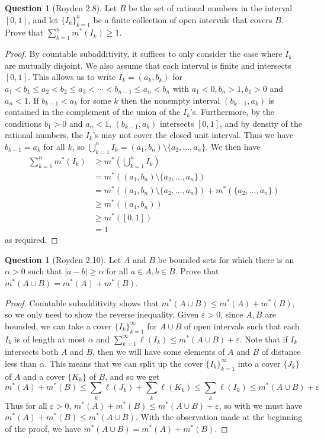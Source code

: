 \documentclass{article}
\theoremstyle{definition} %
\numberwithin{thm}{section} %
\theoremstyle{definition} %
\newtheorem{question}[thm]{Question}
\begin{document}
\begin{question}[Royden 2.8]
Let $B$ be the set of rational numbers in the interval $[0, 1]$, and let ${\{I_k\}}_{k = 1}^n$ be a finite collection of open intervals that covers $B$. Prove that $\sum_{k = 1}^n m^*(I_k) \geq 1$.
\end{question}
\begin{proof}
By countable subadditivity, it suffices to only consider the case where $I_k$ are mutually disjoint. We also assume that each interval is finite and intersects $[0, 1]$. This allows us to write $I_k = (a_k, b_k)$ for $a_1 < b_1 \leq a_2 < b_2 \leq a_3 < \cdots < b_{n - 1} \leq a_n < b_n$ with $a_1 < 0, b_n > 1, b_1 > 0$ and $a_n < 1$. If $b_{k - 1} < a_k$ for some $k$ then the nonempty interval $(b_{k - 1}, a_k)$ is contained in the complement of the union of the $I_k$'s. Furthermore, by the conditions $b_1 > 0$ and $a_n < 1$, $(b_{k - 1}, a_k)$ intersects $[0, 1]$, and by density of the rational numbers, the $I_k$'s may not cover the closed unit interval. Thus we have $b_{k - 1} = a_k$ for all $k$, so $\bigcup_{k = 1}^n I_k = (a_1, b_n) \setminus \{a_2, \dots, a_n\}$. We then have
\begin{align*}
    \sum_{k = 1}^n m^*(I_k) 
    &\geq m^*\left(\bigcup_{k = 1}^n I_k\right) \\
    &= m^*((a_1, b_n) \setminus \{a_2, \dots, a_n\}) \\
    &= m^*((a_1, b_n) \setminus \{a_2, \dots, a_n\}) + m^*(\{a_2, \dots, a_n\})\\
    &\geq m^*((a_1, b_n)) \\
    &\geq m^*([0, 1]) \\
    &= 1
\end{align*}
as required.
\end{proof}

\begin{question}[Royden 2.10]
Let $A$ and $B$ be bounded sets for which there is an $\alpha > 0$ such that $|a - b| \geq \alpha$ for all $a \in A, b \in B$. Prove that $m^*(A \cup B) = m^*(A) + m^*(B)$.
\end{question}
\begin{proof}
Countable subadditivity shows that $m^*(A \cup B) \leq m^*(A) + m^*(B)$, so we only need to show the reverse inequality. Given $\varepsilon > 0$, since $A, B$ are bounded, we can take a cover ${\{I_k\}}_{k = 1}^\infty$ for $A \cup B$ of open intervals such that each $I_k$ is of length at most $\alpha$ and $\sum_{k = 1}^\infty \ell(I_k) \leq m^*(A \cup B) + \varepsilon$. Note that if $I_k$ intersects both $A$ and $B$, then we will have some elements of $A$ and $B$ of distance less than $\alpha$. This means that we can split up the cover ${\{I_k\}}_{k = 1}^\infty$ into a cover $\{J_k\}$ of $A$ and a cover $\{K_k\}$ of $B$, and so we get 
\[ m^*(A) + m^*(B) \leq \sum_k \ell(J_k) + \sum_k \ell(K_k) \leq \sum_k \ell(I_k) \leq m^*(A \cup B) + \varepsilon \]
Thus for all $\varepsilon > 0$, $m^*(A) + m^*(B) \leq m^*(A \cup B) + \varepsilon$, so with we must have $m^*(A) + m^*(B) \leq m^*(A \cup B)$. With the observation made at the beginning of the proof, we have $m^*(A \cup B) = m^*(A) + m^*(B)$.
\end{proof}
\end{document}
